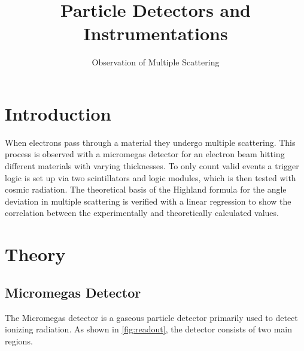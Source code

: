 \documentclass[sn-mathphys-num,iicol]{sn-jnl}
\theoremstyle{thmstyleone}
\theoremstyle{thmstyletwo}
\theoremstyle{thmstylethree}
\begin{document}
        
\title[]{Particle Detectors and Instrumentations}
\subtitle{Observation of Multiple Scattering}
\author*[1]{ }
\author*[1]{ }
\author*[1]{ }
\author*[1]{ }

\maketitle

\section{Introduction}

When electrons pass through a material they undergo multiple scattering.
This process is observed with a micromegas detector for an electron beam hitting different materials with varying thicknesses.
To only count valid events a trigger logic is set up via two scintillators and logic modules, which is then tested with cosmic radiation.
The theoretical basis of the Highland formula for the angle deviation in multiple scattering is verified with a linear regression to show the correlation between the experimentally and theoretically calculated values.


\section{Theory}\label{sec:theory}
\subsection{Micromegas Detector}\label{subsec:theory_micromegas}
The Micromegas detector is a gaseous particle detector primarily used to detect ionizing radiation.
As shown in \autoref{fig:readout}, the detector consists of two main regions. 
\end{document}
